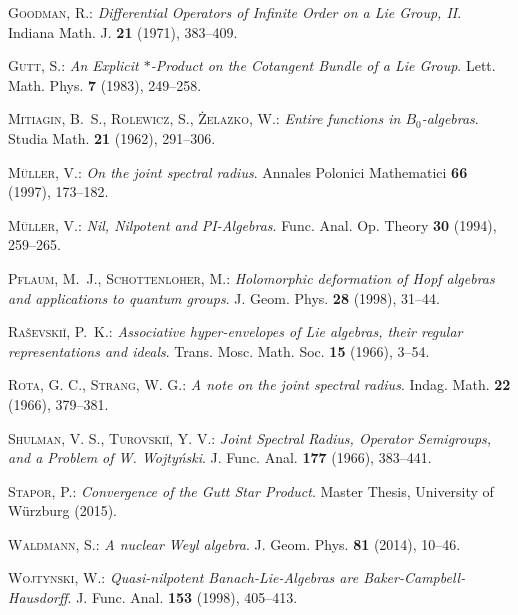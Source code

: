 \documentclass[
11pt,                          %
english                        %
]{article}
\begin{document}
\begin{thebibliography}{1}
\textsc{Goodman, R.: }\newblock \emph{Differential Operators of Infinite Order
  on a Lie Group, II}.
\newblock Indiana Math. J.  \textbf{21} (1971), 383--409.

\textsc{Gutt, S.: }\newblock \emph{An Explicit $*$-Product on the Cotangent
  Bundle of a Lie Group}.
\newblock Lett. Math. Phys.  \textbf{7} (1983), 249--258.

\textsc{Mitiagin, B.~S., Rolewicz, S., {\.{Z}}elazko, W.: }\newblock
  \emph{Entire functions in $B_0$-algebras}.
\newblock Studia Math.  \textbf{21} (1962), 291--306.

\textsc{M{\"u}ller, V.: }\newblock \emph{On the joint spectral radius}.
\newblock Annales Polonici Mathematici \textbf{66} (1997), 173--182.

\textsc{M{\"u}ller, V.: }\newblock \emph{Nil, Nilpotent and PI-Algebras}.
\newblock Func. Anal. Op. Theory  \textbf{30} (1994), 259--265.

\textsc{Pflaum, M.~J., Schottenloher, M.: }\newblock \emph{Holomorphic
  deformation of Hopf algebras and applications to quantum groups}.
\newblock J. Geom. Phys.  \textbf{28} (1998), 31--44.

\textsc{Ra{\v{s}}evski{\u{i}}, P.~K.: }\newblock \emph{Associative
  hyper-envelopes of Lie algebras, their regular representations and ideals}.
\newblock Trans. Mosc. Math. Soc.  \textbf{15} (1966), 3--54.

\textsc{Rota, G. C., Strang, W. G.: }\newblock \emph{A note on the joint spectral 
  radius}.
\newblock Indag. Math. \textbf{22} (1966), 379--381.

\textsc{Shulman, V. S., Turovski\u i, Y. V.: }\newblock \emph{Joint Spectral 
  Radius, Operator Semigroups, and a Problem of W. Wojty\'nski}.
\newblock J. Func. Anal. \textbf{177} (1966), 383--441.

\textsc{Stapor, P.: }\newblock \emph{Convergence 
  of the Gutt Star Product}.
\newblock Master Thesis, University of W\"urzburg (2015).

\textsc{Waldmann, S.: }\newblock \emph{A nuclear Weyl algebra}.
\newblock J. Geom. Phys.  \textbf{81} (2014), 10--46.

\textsc{Wojtynski, W.: }\newblock \emph{Quasi-nilpotent 
{B}anach-{L}ie-Algebras are {B}aker-{C}ampbell-{H}ausdorff}.
\newblock J. Func. Anal.  \textbf{153} (1998), 405--413.

\end{thebibliography}



\end{document}
